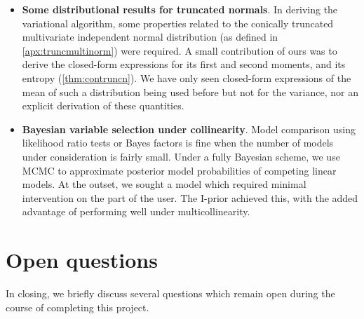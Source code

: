 \documentclass[showframe,11pt,twoside,openright]{report}
\begin{document}
\begin{itemize}
  \item \textbf{Some distributional results for truncated normals}. 
  In deriving the variational algorithm, some properties related to the conically truncated multivariate independent normal distribution (as defined in \cref{apx:truncmultinorm}) were required.
  A small contribution of ours was to derive the closed-form expressions for its first and second moments, and its entropy (\cref{thm:contruncn}).
  We have only seen closed-form expressions of the mean of such a distribution being used before \citep{girolami2006variational} but not for the variance, nor an explicit derivation of these quantities.
    
  \item \textbf{Bayesian variable selection under collinearity}. 
  Model comparison using likelihood ratio tests or Bayes factors is fine when the number of models under consideration is fairly small.
  Under a fully Bayesian scheme, we use MCMC to approximate posterior model probabilities of competing linear models.
  At the outset, we sought a model which required minimal intervention on the part of the user.
  The I-prior achieved this, with the added advantage of performing well under multicollinearity.
  
\end{itemize}

\section{Open questions}

In closing, we briefly discuss several questions which remain open during the course of completing this project.
\end{document}
